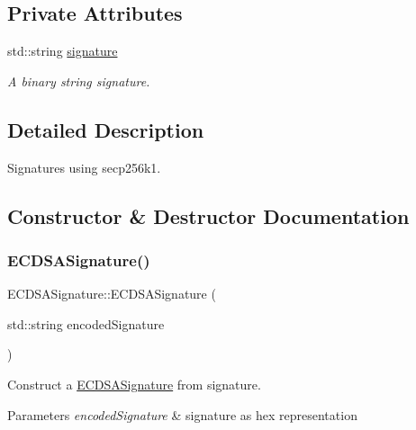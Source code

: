 \subsection*{Private Attributes}
\begin{DoxyCompactItemize}
\item 
std\+::string \mbox{\hyperlink{classECDSASignature_aae4afcd90bbe797c9c60fb6967dd0849}{signature}}
\begin{DoxyCompactList}\small\item\em A binary string signature. \end{DoxyCompactList}\end{DoxyCompactItemize}


\subsection{Detailed Description}
Signatures using secp256k1. 

\subsection{Constructor \& Destructor Documentation}
\mbox{\label{classECDSASignature_a9b02f26402e6e70ef8fa80f799652c27}} 
\subsubsection{\texorpdfstring{E\+C\+D\+S\+A\+Signature()}{ECDSASignature()}\hspace{0.1cm}{\footnotesize\ttfamily [1/2]}}
{\footnotesize\ttfamily E\+C\+D\+S\+A\+Signature\+::\+E\+C\+D\+S\+A\+Signature (\begin{DoxyParamCaption}\item[{std\+::string}]{encoded\+Signature }\end{DoxyParamCaption})}



Construct a \mbox{\hyperlink{classECDSASignature}{E\+C\+D\+S\+A\+Signature}} from signature. 


\begin{DoxyParams}{Parameters}
{\em encoded\+Signature} & signature as hex representation \\
\hline
\end{DoxyParams}
\mbox{\label{classECDSASignature_a459b85f89b2d2706cac10c8f28298e9b}} 
